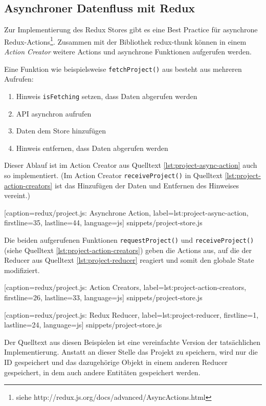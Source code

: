 \subsection{Asynchroner Datenfluss mit Redux}

Zur Implementierung des Redux Stores gibt es eine Best Practice für asynchrone Redux-Actions\footnote{siehe http://redux.js.org/docs/advanced/AsyncActions.html}. Zusammen mit der Bibliothek redux-thunk können in einem \emph{Action Creator} weitere Actions und asynchrone Funktionen aufgerufen werden.

Eine Funktion wie beispielsweise \texttt{fetchProject()} aus  besteht aus mehreren Aufrufen:

\begin{enumerate}
 \item Hinweis \texttt{isFetching} setzen, dass Daten abgerufen werden
 \item API asynchron aufrufen
 \item Daten dem Store hinzufügen
 \item Hinweis entfernen, dass Daten abgerufen werden
\end{enumerate}

Dieser Ablauf ist im Action Creator aus Quelltext \ref{lst:project-async-action} auch so implementiert. (Im Action Creator \texttt{receiveProject()} in Quelltext \ref{lst:project-action-creators} ist das Hinzufügen der Daten und Entfernen des Hinweises vereint.)


  [caption={redux/project.js: Asynchrone Action},
  label={lst:project-async-action},
  firstline=35,
  lastline=44,
  language=js]
  {snippets/project-store.js}

Die beiden aufgerufenen Funktionen \texttt{requestProject()} und \texttt{receiveProject()} (siehe Quelltext \ref{lst:project-action-creators}) geben die Actions aus, auf die der Reducer aus Quelltext \ref{lst:project-reducer} reagiert und somit den globale State modifiziert.


  [caption={redux/project.js: Action Creators},
  label={lst:project-action-creators},
  firstline=26,
  lastline=33,
  language=js]
  {snippets/project-store.js}


  [caption={redux/project.js: Redux Reducer},
  label={lst:project-reducer},
  firstline=1,
  lastline=24,
  language=js]
  {snippets/project-store.js}

Der Quelltext aus diesen Beispielen ist eine vereinfachte Version der tat\-säch\-lich\-en Implementierung. Anstatt an dieser Stelle das Projekt zu speichern, wird nur die ID gespeichert und das dazugehörige Objekt in einem anderen Reducer gespeichert, in dem auch andere Entitäten gespeichert werden.


